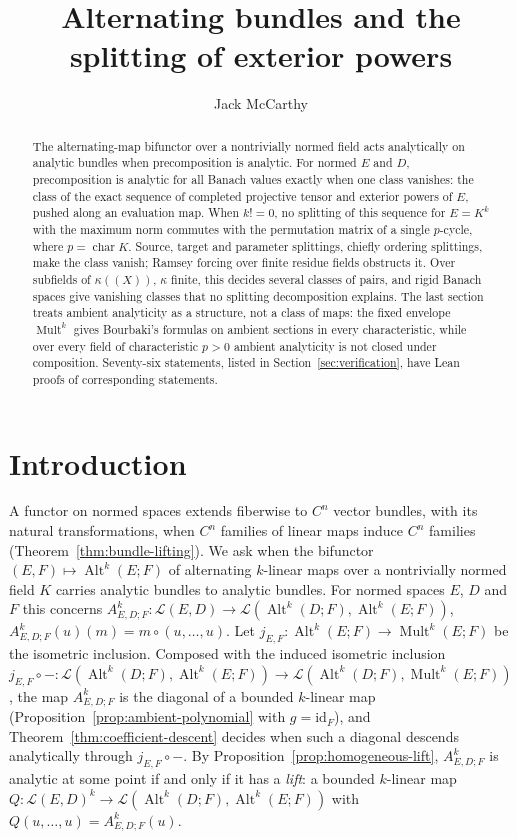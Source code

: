\documentclass[11pt]{amsart}
\title{Alternating bundles and the splitting of exterior powers}
\author{Jack McCarthy}
\theoremstyle{definition}
\theoremstyle{remark}
\numberwithin{equation}{section}
\newcommand{\cL}{\mathcal L}
\newcommand{\Alt}{\operatorname{Alt}}
\newcommand{\Mult}{\operatorname{Mult}}
\newcommand{\id}{\mathrm{id}}
\theoremstyle{plain}
\theoremstyle{definition}
\theoremstyle{plain}
\begin{document}
\begin{abstract}
The alternating-map bifunctor over a nontrivially normed field acts analytically on analytic bundles when
precomposition is analytic. For normed $E$ and $D$, precomposition is analytic for all Banach values exactly
when one class vanishes: the class of the exact sequence of completed projective tensor and exterior powers of $E$,
pushed along an evaluation map. When $k!=0$, no splitting of this sequence for $E=K^k$ with the maximum norm commutes with
the permutation matrix of a single $p$-cycle, where $p=\operatorname{char}K$. Source, target
and parameter splittings, chiefly ordering splittings, make the class vanish; Ramsey forcing over finite residue fields
obstructs it. Over subfields of $\kappa((X))$, $\kappa$ finite, this decides several classes of pairs, and rigid Banach
spaces give vanishing classes that no splitting decomposition explains. The last section treats ambient analyticity as a
structure, not a class of maps: the fixed envelope $\Mult^k$ gives Bourbaki's formulas on ambient sections in every
characteristic, while over every field of characteristic $p>0$ ambient analyticity is not closed under composition. Seventy-six statements, listed in
Section~\ref{sec:verification}, have Lean proofs of corresponding statements.
\end{abstract}
\maketitle
\setcounter{tocdepth}{1}
\begingroup
\small
\linespacing=8pt
\tableofcontents\removelastskip
\endgroup
\clearpage
\section{Introduction}\label{sec:intro}

A functor on normed spaces extends fiberwise to $C^n$ vector bundles, with its natural transformations, when $C^n$
families of linear maps induce $C^n$ families (Theorem~\ref{thm:bundle-lifting}). We ask when the bifunctor
$(E,F)\mapsto\Alt^k(E;F)$ of alternating $k$-linear maps over a nontrivially normed field $K$ carries analytic bundles
to analytic bundles. For normed spaces $E$, $D$ and $F$ this concerns
$A^k_{E,D;F}\colon\cL(E,D)\to\cL(\Alt^k(D;F),\Alt^k(E;F))$, $A^k_{E,D;F}(u)(m)=m\circ(u,\dots,u)$. Let
$j_{E,F}\colon\Alt^k(E;F)\to\Mult^k(E;F)$ be the isometric inclusion. Composed with the induced isometric inclusion
$j_{E,F}\circ{-}\colon\cL(\Alt^k(D;F),\Alt^k(E;F))\to\cL(\Alt^k(D;F),\Mult^k(E;F))$, the map $A^k_{E,D;F}$ is the
diagonal of a bounded $k$-linear map (Proposition~\ref{prop:ambient-polynomial} with $g=\id_F$), and
Theorem~\ref{thm:coefficient-descent} decides when such a diagonal descends analytically through $j_{E,F}\circ{-}$. By Proposition~\ref{prop:homogeneous-lift}, $A^k_{E,D;F}$ is analytic at some
point if and only if it has a \emph{lift}: a bounded $k$-linear map $Q\colon\cL(E,D)^k\to\cL(\Alt^k(D;F),\Alt^k(E;F))$
with $Q(u,\dots,u)=A^k_{E,D;F}(u)$.
\end{document}
